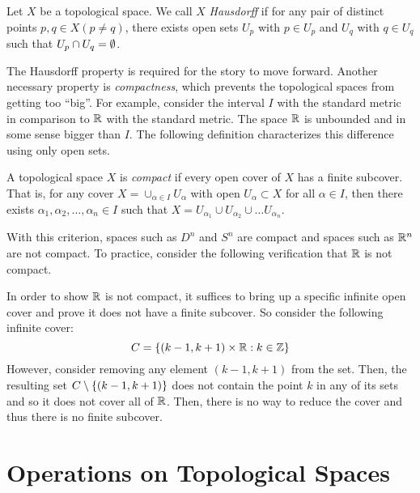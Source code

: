 \documentclass[../sean_thesis.tex]{subfiles}
\begin{document}
\begin{definition}[Hausdorff]
	Let $X$ be a topological space. We call $X$ \emph{Hausdorff} if for any pair of distinct points $p,q \in X (p \neq q)$, there exists open sets $U_p$ with $p \in U_p$ and $U_q$ with $q \in U_q$ such that $U_p \cap U_q = \emptyset$.
\end{definition}

The Hausdorff property is required for the story to move forward. Another necessary property is \emph{compactness}, which prevents the topological spaces from getting too ``big''. For example, consider the interval $I$ with the standard metric in comparison to $\mathbb{R}$ with the standard metric. The space $\mathbb{R}$ is unbounded and in some sense bigger than $I$. The following definition characterizes this difference using only open sets.

\begin{definition}[Compact]
    A topological space $X$ is \emph{compact} if every open cover of $X$ has a finite subcover. That is, for any cover $X = \cup_{\alpha \in I} U_\alpha$ with open $U_\alpha \subset X$ for all $\alpha \in I$, then there exists $\alpha_1, \alpha_2, \dots, \alpha_n \in I$ such that $X = U_{\alpha_1} \cup U_{\alpha_2} \cup \dots U_{\alpha_n}$.
\end{definition}

With this criterion, spaces such as $D^n$ and $S^n$ are compact and spaces such as $\mathbb{R}^n$ are not compact. To practice, consider the following verification that $\mathbb{R}$ is not compact.
\begin{example}
	In order to show $\mathbb{R}$ is not compact, it suffices to bring up a specific infinite open cover and prove it does not have a finite subcover. So consider the following infinite cover:
	\begin{equation*}
		C = \left\{(k-1,k+1) \times \mathbb{R} : k \in \mathbb{Z}\right\}
	\end{equation*}
	However, consider removing any element $(k-1, k+1)$ from the set. Then, the resulting set $C \setminus \left\{(k-1,k+1)\right\}$ does not contain the point $k$ in any of its sets and so it does not cover all of $\mathbb{R}$. Then, there is no way to reduce the cover and thus there is no finite subcover.
\end{example}


\section{Operations on Topological Spaces}
\end{document}

